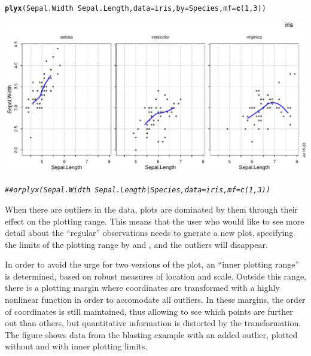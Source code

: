 \documentclass[11pt]{article}\usepackage[]{graphicx}\usepackage[]{color}
\makeatletter
\def\maxwidth{ %
  \ifdim\Gin@nat@width>\linewidth
    \linewidth
  \else
    \Gin@nat@width
  \fi
}
\newcommand{\hlnum}[1]{\textcolor[rgb]{0.686,0.059,0.569}{#1}}%
\newcommand{\hlcom}[1]{\textcolor[rgb]{0.678,0.584,0.686}{\textit{#1}}}%
\newcommand{\hlopt}[1]{\textcolor[rgb]{0,0,0}{#1}}%
\newcommand{\hlstd}[1]{\textcolor[rgb]{0.345,0.345,0.345}{#1}}%
\newcommand{\hlkwc}[1]{\textcolor[rgb]{0.333,0.667,0.333}{#1}}%
\newcommand{\hlkwd}[1]{\textcolor[rgb]{0.737,0.353,0.396}{\textbf{#1}}}%
\newenvironment{kframe}{%
 \def\at@end@of@kframe{}%
 \ifinner\ifhmode%
  \def\at@end@of@kframe{\end{minipage}}%
  \begin{minipage}{\columnwidth}%
 \fi\fi%
 \def\FrameCommand##1{\hskip\@totalleftmargin \hskip-\fboxsep
 \colorbox{shadecolor}{##1}\hskip-\fboxsep
     \hskip-\linewidth \hskip-\@totalleftmargin \hskip\columnwidth}%
 \MakeFramed {\advance\hsize-\width
   \@totalleftmargin\z@ \linewidth\hsize
   \@setminipage}}%
 {\par\unskip\endMakeFramed%
 \at@end@of@kframe}
\newenvironment{knitrout}{}{} %
\makeatother
\begin{document}
\begin{knitrout}
\color{fgcolor}\begin{kframe}
\begin{alltt}
\hlkwd{plyx}\hlstd{(Sepal.Width}\hlopt{~}\hlstd{Sepal.Length,} \hlkwc{data}\hlstd{=iris,} \hlkwc{by}\hlstd{=Species,} \hlkwc{mf}\hlstd{=}\hlkwd{c}\hlstd{(}\hlnum{1}\hlstd{,}\hlnum{3}\hlstd{))}
\end{alltt}
\end{kframe}
\includegraphics[width=\maxwidth]{figure/plyx_group-1} 
\begin{kframe}\begin{alltt}
\hlcom{## or plyx(Sepal.Width~Sepal.Length | Species, data=iris, mf=c(1,3))}
\end{alltt}
\end{kframe}
\end{knitrout}

When there are outliers in the data, plots are dominated by them through 
their effect on the plotting range. This means that the user who would like to
see more detail about the ``regular'' observations needs to gnerate a new
plot, specifying the limits of the plotting range by  and ,
and the outliers will disappear.

In order to avoid the urge for two versions of the plot, an ``inner
plotting range'' is determined, based on robust measures of 
location and scale. Outside this range, there is a plotting margin where
coordinates are transformed with a highly nonlinear function in order to
accomodate all outliers. 
In these margins, the order of coordinates is still maintained, thus
allowing to see which points are further out than others, but quantitative
information is distorted by the transformation.
The figure shows data from the blasting example with an added outlier,
plotted without and with inner plotting limits.
\end{document}
